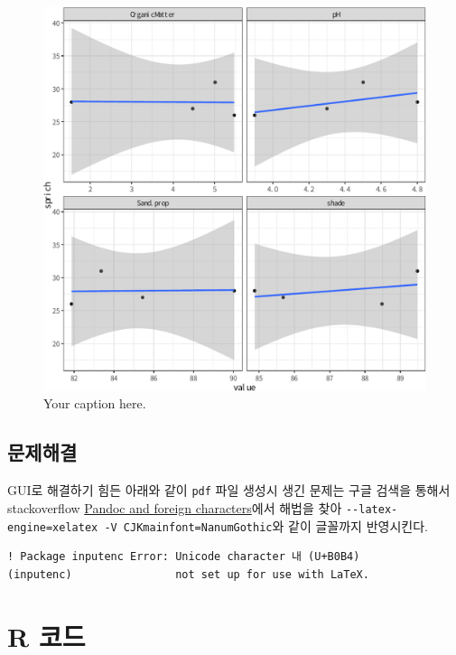 \documentclass[12pt,]{article}
\begin{document}
\begin{figure}

{\centering \includegraphics{ms_files/figure-latex/figName-1} 

}

\caption{Your caption here.}\label{fig:figName}
\end{figure}

\subsection{문제해결}

GUI로 해결하기 힘든 아래와 같이 \texttt{pdf} 파일 생성시 생긴 문제는
구글 검색을 통해서 stackoverflow
\href{https://stackoverflow.com/questions/18178084/pandoc-and-foreign-characters}{Pandoc
and foreign characters}에서 해법을 찾아
\texttt{-\/-latex-engine=xelatex\ -V\ CJKmainfont=NanumGothic}와 같이
글꼴까지 반영시킨다.

\begin{verbatim}
! Package inputenc Error: Unicode character 내 (U+B0B4)
(inputenc)                not set up for use with LaTeX.
\end{verbatim}

\section{R 코드}\label{r-}
\end{document}

